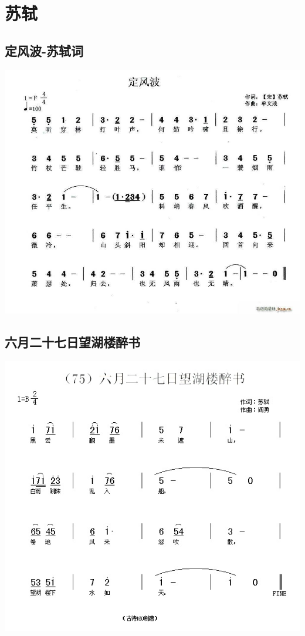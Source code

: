 \documentclass[cn,pad,chinesefont=nofont]{elegantbook}
\begin{document}
\chapter{苏轼}
\section{定风波-苏轼词}
    \includegraphics[width=\textwidth]{dongxiao/20200411-定风波.jpg}
\section{六月二十七日望湖楼醉书}
    \includegraphics[width=\textwidth]{dongxiao/20200627-苏轼-六月二十七日望湖楼醉书.jpg} 
\end{document}

